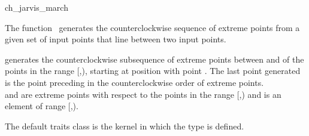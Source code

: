 
\begin{ccRefFunction}{ch_jarvis_march}  %

\ccDefinition
  
The function \ccRefName\ generates the counterclockwise sequence of extreme
points from a given set of input points that line between two input points.



            {generates the counterclockwise subsequence of
             extreme points between  and  of the 
             points in the range [,), starting at 
             position  with point .  The last point 
             generated is the point preceding  in the 
             counterclockwise order of extreme points.\\
            \ccPrecond%
             and  are extreme points with respect to
            the points in the range [,) and 
            is an element of range [,).}


The default traits class  is the kernel in which the
type  is defined.



\end{ccRefFunction}
